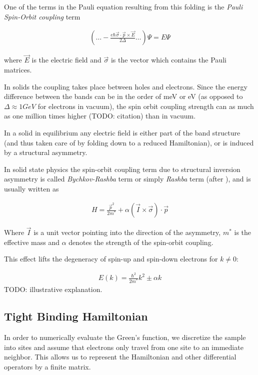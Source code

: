 \documentclass[11pt]{report}
\newcommand{\inp}[1]{\ensuremath{\left(#1\right)}}
\begin{document}
One of the terms in the Pauli equation resulting from this folding is the
\emph{Pauli Spin-Orbit coupling} term\cite{winkler2003}

\begin{align}
    \left( \ldots - \frac{e\hbar \vec\sigma \cdot \vec p \times \vec E}
                    {2\Delta} \ldots\right)\Psi = E \Psi
\end{align}

where $\vec E$ is the electric field and $\vec \sigma$ is the vector
which contains the Pauli matrices.

In solids the coupling takes place between holes and electrons. Since the
energy difference between the bands can be in the order of meV or eV
(as opposed to $\Delta \approx 1GeV$ for electrons in vacuum), the spin orbit
coupling strength can as much as one million times higher (TODO: citation)
than in vacuum.

In a solid in equilibrium any electric field is either part of the band
structure (and thus taken care of by folding down to a reduced Hamiltonian),
or is induced by a structural asymmetry.

In solid state physics the spin-orbit coupling term due to structural
inversion asymmetry is called \emph{Bychkov-Rashba} term or simply
\emph{Rashba} term (after \cite{rashba}), and is usually written as

\begin{align}
    H = \frac{\vec p ^2}{2m^*} + \alpha \inp{\vec I \times  \vec \sigma} \cdot \vec p
\end{align}

Where $\vec I$ is a unit vector pointing into the direction of the asymmetry,
$m^*$ is the effective mass
and $\alpha$ denotes the strength of the spin-orbit coupling.

This effect lifts the degeneracy of spin-up and spin-down electrons for
$k \not= 0$:

\begin{align}
    E(k) = \frac{\hbar^2}{2 m^*} k^2 \pm \alpha k
\end{align}
TODO: illustrative explanation.


\subsection*{Tight Binding Hamiltonian}
\label{sec:tight-binding}


In order to numerically evaluate the Green's function, we
discretize the sample into sites and assume that electrons only travel from
one site to an immediate neighbor. This allows us to represent the
Hamiltonian and other differential operators by a finite matrix.
\end{document}
